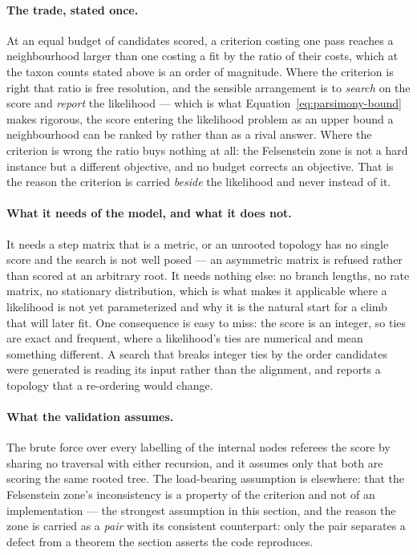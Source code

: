 \documentclass[11pt,a4paper]{article}
\begin{document}
\paragraph{The trade, stated once.}
At an equal budget of candidates scored, a criterion costing one pass
reaches a neighbourhood larger than one costing a fit by the ratio of their
costs, which at the taxon counts stated above is an order of magnitude. Where the criterion is right that ratio is free
resolution, and the sensible arrangement is to \emph{search} on the score
and \emph{report} the likelihood --- which is what
Equation~\ref{eq:parsimony-bound} makes rigorous, the score entering the
likelihood problem as an upper bound a neighbourhood can be ranked by rather
than as a rival answer. Where the criterion is wrong the ratio buys nothing
at all: the Felsenstein zone is not a hard instance but a different
objective, and no budget corrects an objective. That is the reason the
criterion is carried \emph{beside} the likelihood and never instead of it.

\paragraph{What it needs of the model, and what it does not.}
It needs a step matrix that is a metric, or an unrooted topology has no
single score and the search is not well posed --- an asymmetric matrix is
refused rather than scored at an arbitrary root. It needs nothing else: no
branch lengths, no rate matrix, no stationary distribution, which is what
makes it applicable where a likelihood is not yet parameterized and why it
is the natural start for a climb that will later fit. One consequence is
easy to miss: the score is an integer, so ties are exact and frequent, where
a likelihood's ties are numerical and mean something different. A search
that breaks integer ties by the order candidates were generated is reading
its input rather than the alignment, and reports a topology that a
re-ordering would change.

\paragraph{What the validation assumes.}
The brute force over every labelling of the internal nodes referees the
score by sharing no traversal with either recursion, and it assumes only
that both are scoring the same rooted tree. The load-bearing assumption is
elsewhere: that the Felsenstein zone's inconsistency is a property of the
criterion and not of an implementation --- the strongest assumption in this
section, and the reason the zone is carried as a \emph{pair} with its
consistent counterpart: only the pair separates a defect from a theorem the
section asserts the code reproduces.
\end{document}
